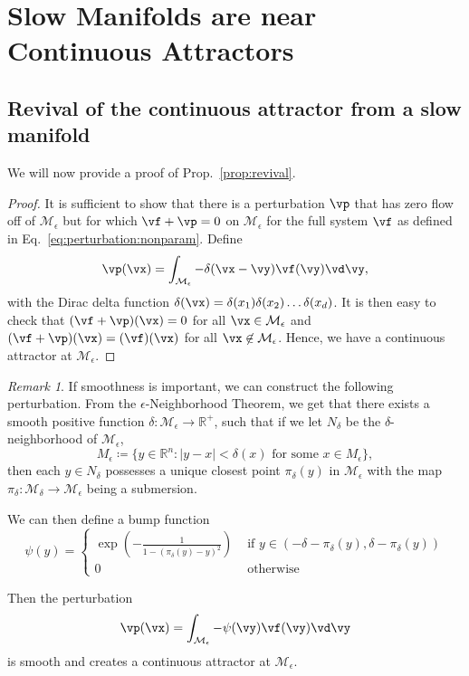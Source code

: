 \documentclass{article} %
\newcounter{ct}
\newcommand{\reals}{\mathbb{R}}
\newcommand{\manifold}{\mathcal{M}}
\theoremstyle{definition}
\theoremstyle{remark}
\newtheorem{remark}{Remark}
\begin{document}
\newpage
\section{Slow Manifolds are near Continuous Attractors}
\subsection{Revival of the continuous attractor from a slow manifold}\label{sec:supp:proofprop1}

 We will now provide a proof of Prop.~\ref{prop:revival}.

\begin{proof}%
It is sufficient to show that there is a perturbation \(\vp\) that has zero flow off of \(\manifold_\epsilon\) but for which \(\vf+\vp=0\) on \(\manifold_\epsilon\) for the full system \(\vf\)  as defined in Eq.~\ref{eq:perturbation:nonparam}.
Define
\[\vp(\vx) = \int_{\manifold_\epsilon} - \delta(\vx-\vy)\vf(\vy)\vd\vy,\]
 with the Dirac delta function \(\delta(\vx)=\delta(x_1)\delta(x_2)\dots\delta(x_d)\).
It is then easy to check that \((\vf+\vp)(\vx)=0\) for all \(\vx\in\manifold_\epsilon\) and \((\vf+\vp)(\vx)=(\vf)(\vx)\) for all \(\vx\not\in\manifold_\epsilon\).
Hence, we have a continuous attractor at \(\manifold_\epsilon\).
\end{proof}

\begin{remark}
If smoothness is important, we can construct the following perturbation.
From the \(\epsilon\)-Neighborhood Theorem, we get that  there exists a smooth positive function \(\delta\colon \manifold_\epsilon \rightarrow \reals^+\),
 such that if we let \(N_\delta\) be the
\(\delta\)-neighborhood of \(\manifold_\epsilon\),
\[
M_\epsilon\coloneqq \{y  \in \reals^n : |y - x| < \delta(x) \text{ for some }  x \in M_\epsilon\},
\]
then each \(y\in N_\delta\) possesses a unique closest point \(\pi_\delta(y)\) in \(\manifold_\epsilon\) with the map \(\pi_\delta\colon \manifold_\delta \rightarrow \manifold_\epsilon\) being a submersion.

We can then define a bump function
\begin{equation}
\psi(y) =
\begin{cases}
\exp\left(-\frac{1}{1-(\pi_\delta(y)-y)^2}\right) &\text{  if  } y\in(-\delta-\pi_\delta(y), \delta-\pi_\delta(y))\\
0 & \text{  otherwise }
\end{cases}
\end{equation}

Then the perturbation
\[
\vp(\vx) = \int_{\manifold_\epsilon}-\psi(\vy)\vf(\vy)\vd\vy
\]
is smooth and creates a continuous attractor at \(\manifold_\epsilon\).
\end{remark}
\end{document}
